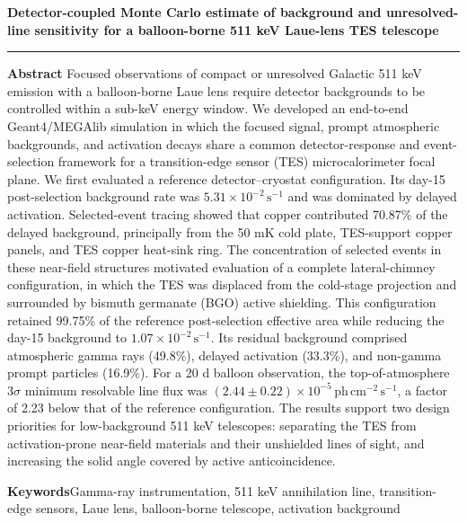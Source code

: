 \documentclass[11pt]{article}
\newcommand{\phcms}{\ensuremath{\,\mathrm{ph\,cm^{-2}\,s^{-1}}}}
\newcommand{\cps}{\ensuremath{\,\mathrm{s^{-1}}}}
\begin{document}
\thispagestyle{fancy}
\begin{flushleft}
{\LARGE\bfseries Detector-coupled Monte Carlo estimate of background and unresolved-line sensitivity for a balloon-borne 511 keV Laue-lens TES telescope\par}
\end{flushleft}
\vspace{0.7em}
\noindent\rule{\textwidth}{0.4pt}
\vspace{0.5em}

\noindent\textbf{Abstract}\hspace{0.7em}
Focused observations of compact or unresolved Galactic 511 keV emission with a
balloon-borne Laue lens require detector backgrounds to be controlled within a
sub-keV energy window. We developed an end-to-end Geant4/MEGAlib simulation in
which the focused signal, prompt atmospheric backgrounds, and activation decays
share a common detector-response and event-selection framework for a
transition-edge sensor (TES) microcalorimeter focal plane. We first evaluated a
reference detector--cryostat configuration. Its day-15 post-selection
background rate was $5.31\times10^{-2}\cps$ and was dominated by delayed
activation. Selected-event tracing showed that copper contributed 70.87\% of
the delayed background, principally from the 50 mK cold plate, TES-support
copper panels, and TES copper heat-sink ring. The concentration of selected
events in these near-field structures motivated evaluation of a complete
lateral-chimney configuration, in which the TES was displaced from the
cold-stage projection and surrounded by bismuth germanate (BGO) active
shielding. This configuration retained 99.75\% of the reference post-selection
effective area while reducing the day-15 background to
$1.07\times10^{-2}\cps$. Its residual background comprised atmospheric
gamma rays (49.8\%), delayed activation (33.3\%), and non-gamma
prompt particles (16.9\%). For a 20 d balloon observation, the top-of-atmosphere
$3\sigma$ minimum resolvable line flux was
$(2.44\pm0.22)\times10^{-5}\phcms$, a factor of 2.23 below that of the reference
configuration. The results support two design priorities for low-background
511 keV telescopes: separating the TES from activation-prone near-field
materials and their unshielded lines of sight, and increasing the solid angle
covered by active anticoincidence.

\vspace{0.7em}
\noindent\textbf{Keywords}\hspace{0.7em}Gamma-ray instrumentation, 511 keV annihilation line, transition-edge sensors, Laue lens, balloon-borne telescope, activation background
\end{document}
